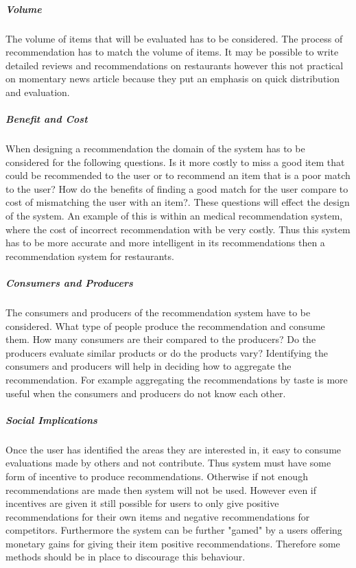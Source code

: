 \documentclass[a4paper,oneside,11pt]{report}
\begin{document}
\subparagraph{Volume}
The volume of items that will be evaluated has to be considered. The process of recommendation has to match the volume of items. It may be possible to write detailed reviews and recommendations on restaurants however this not practical on momentary news article because they put an emphasis on quick distribution and evaluation.

\subparagraph{Benefit and Cost}
When designing a recommendation the domain of the system has to be considered for the following questions. Is it more costly to miss a good item that could be recommended to the user or to recommend an item that is a poor match to the user? How do the benefits of finding a good match for the user compare to cost of mismatching the user with an item?. These questions will effect the design of the system. An example of this is within an medical recommendation system, where the cost of incorrect recommendation with be very costly. Thus this system has to be more accurate and more intelligent in its recommendations then a recommendation system for restaurants.

\subparagraph{Consumers and Producers}
The consumers and producers of the recommendation system have to be considered. What type of people produce the recommendation and consume them. How many consumers are their compared to the producers? Do the producers evaluate similar products or do the products vary? Identifying the consumers and producers will help in deciding how to aggregate the recommendation. For example aggregating the recommendations by taste is more useful when the consumers and producers do not know each other. 

\subparagraph{Social Implications}
Once the user has identified the areas they are interested in, it easy to consume evaluations made by others and not contribute. Thus system must have some form of incentive to produce recommendations. Otherwise if not enough recommendations are made then system will not be used. However even if incentives are given it still possible for users to only give positive recommendations for their own items and negative recommendations for competitors.  Furthermore the system can be further "gamed" by a users offering monetary gains for giving their item positive recommendations. Therefore some methods should be in place to discourage this behaviour.
\end{document}

